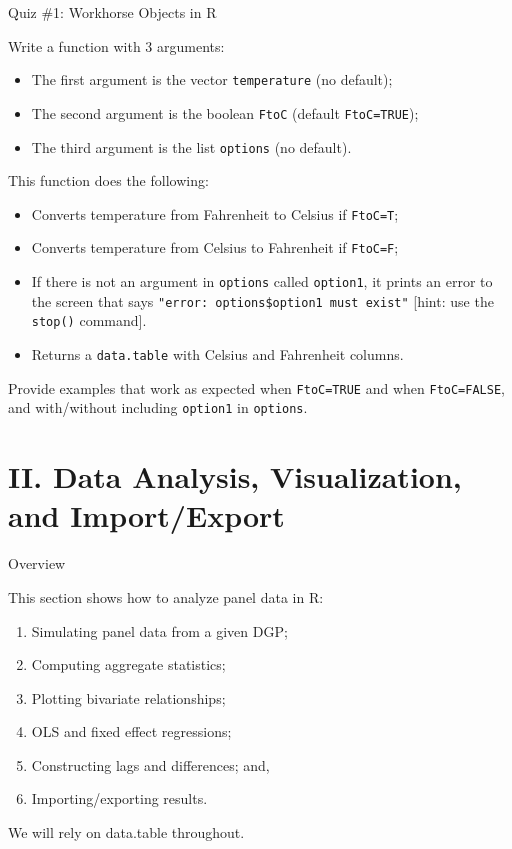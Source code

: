 \documentclass[10pt,ignorenonframetext,]{beamer}
\providecommand{\tightlist}{%
\setlength{\itemsep}{0pt}\setlength{\parskip}{0pt}}
\begin{document}
\begin{frame}[fragile]{Quiz \#1: Workhorse Objects in R}

Write a function with 3 arguments:

\begin{itemize}
\tightlist
\item
  The first argument is the vector \texttt{temperature} (no default);
\item
  The second argument is the boolean \texttt{FtoC} (default
  \texttt{FtoC=TRUE});
\item
  The third argument is the list \texttt{options} (no default).
\end{itemize}

This function does the following:

\begin{itemize}
\tightlist
\item
  Converts temperature from Fahrenheit to Celsius if \texttt{FtoC=T};
\item
  Converts temperature from Celsius to Fahrenheit if \texttt{FtoC=F};
\item
  If there is not an argument in \texttt{options} called
  \texttt{option1}, it prints an error to the screen that says
  \texttt{"error:\ options\$option1\ must\ exist"} {[}hint: use the
  \texttt{stop()} command{]}.
\item
  Returns a \texttt{data.table} with Celsius and Fahrenheit columns.
\end{itemize}

Provide examples that work as expected when \texttt{FtoC=TRUE} and when
\texttt{FtoC=FALSE}, and with/without including \texttt{option1} in
\texttt{options}.

\end{frame}

\section{II. Data Analysis, Visualization, and
Import/Export}\label{ii.-data-analysis-visualization-and-importexport}

\begin{frame}{Overview}

This section shows how to analyze panel data in R:

\begin{enumerate}
\def\labelenumi{\arabic{enumi}.}
\tightlist
\item
  Simulating panel data from a given DGP;
\item
  Computing aggregate statistics;
\item
  Plotting bivariate relationships;
\item
  OLS and fixed effect regressions;
\item
  Constructing lags and differences; and,
\item
  Importing/exporting results.
\end{enumerate}

We will rely on data.table throughout.

\end{frame}
\end{document}
